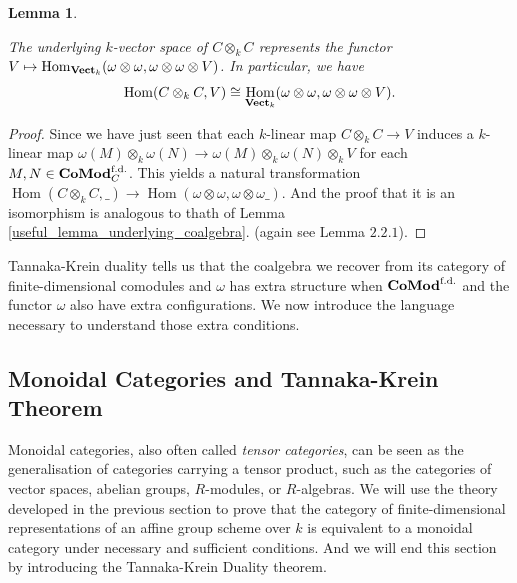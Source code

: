 \documentclass{article}
\theoremstyle{plain}
\newtheorem{theorem}{Theorem}[subsection]
\newtheorem{lemma}[theorem]{Lemma}
\theoremstyle{definition}
\DeclareMathOperator{\Hom}{Hom}
\DeclareMathOperator{\End}{End}
\DeclareMathOperator{\Vect}{\bf{Vect}}
\DeclareMathOperator{\Comod}{\bf{CoMod}}
\begin{document}
\begin{lemma}
\label{useful_lemma_underlying_coalgebra_2}

    
    The underlying $k$-vector space of $C\otimes_kC$ represents the functor $V\mapsto \Hom_{\Vect_k}(\omega\otimes\omega, \omega\otimes\omega\otimes V)$.
    In particular, we have 
    $$\Hom(C\otimes_kC, V)\cong \Hom_{\Vect_k}(\omega\otimes\omega , \omega\otimes\omega \otimes V).$$
\end{lemma}
\begin{proof}
    Since we have just seen that each $k$-linear map $C\otimes_k C\rightarrow V$ induces a $k$-linear map $\omega(M)\otimes_k \omega(N) \rightarrow \omega(M)\otimes_k \omega(N)\otimes_k V$ for each $M,N\in\Comod^{\text{f.d.}}_C$.
    This yields a natural transformation $\Hom(C\otimes_kC,\_)\rightarrow \Hom(\omega\otimes\omega ,\omega\otimes \omega\_)$.
    And the proof that it is an isomorphism is analogous to thath of Lemma \ref{useful_lemma_underlying_coalgebra}.
    (again see \cite{Schauenburg} Lemma $2.2.1$).
\end{proof}

\noindent Tannaka-Krein duality tells us that the coalgebra we recover from its category of finite-dimensional comodules and $\omega$ has extra structure when $\Comod^{\text{f.d.}}$ and the functor $\omega$ also have extra configurations. 
We now introduce the language necessary to understand those extra conditions.\\

\subsection{Monoidal Categories and Tannaka-Krein Theorem}

Monoidal categories, also often called \textit{tensor categories}, can be seen as the generalisation of categories carrying a tensor product, such as the categories of vector spaces, abelian groups, $R$-modules, or $R$-algebras.
We will use the theory developed in the previous section to prove that the category of finite-dimensional representations of an affine group scheme over $k$ is equivalent to a monoidal category under necessary and sufficient conditions. 
And we will end this section by introducing the Tannaka-Krein Duality theorem.
\end{document}
